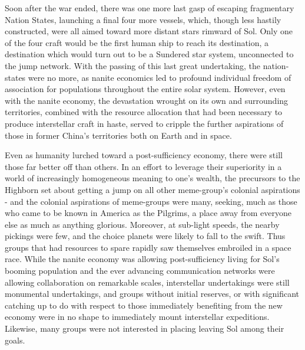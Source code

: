 Soon after the war ended, there was one more last gasp of escaping
fragmentary Nation States, launching a final four more vessels, which,
though less hastily constructed, were all aimed toward more distant
stars rimward of Sol. Only one of the four craft would be the first
human ship to reach its destination, a destination which would turn
out to be a Sundered star system, unconnected to the jump
network. With the passing of this last great undertaking, the
nation-states were no more, as nanite economics led to profound
individual freedom of association for populations throughout the
entire solar system. However, even with the nanite economy, the
devastation wrought on its own and surrounding territories, combined
with the resource allocation that had been necessary to produce
interstellar craft in haste, served to cripple the further aspirations
of those in former China's territories both on Earth and in space.

Even as humanity lurched toward a post-sufficiency economy, there were
still those far better off than others. In an effort to leverage their
superiority in a world of increasingly homogeneous meaning to one's
wealth, the precursors to the Highborn set about getting a jump on all
other meme-group's colonial aspirations - and the colonial aspirations
of meme-groups were many, seeking, much as those who came to be known
in America as the Pilgrims, a place away from everyone else as much as
anything glorious. Moreover, at sub-light speeds, the nearby pickings
were few, and the choice planets were likely to fall to the
swift. Thus groups that had resources to spare rapidly saw themselves
embroiled in a space race. While the nanite economy was allowing
post-sufficiency living for Sol's booming population and the ever
advancing communication networks were allowing collaboration on
remarkable scales, interstellar undertakings were still monumental
undertakings, and groups without initial reserves, or with significant
catching up to do with respect to those immediately benefiting from
the new economy were in no shape to immediately mount interstellar
expeditions. Likewise, many groups were not interested in placing
leaving Sol among their goals.

